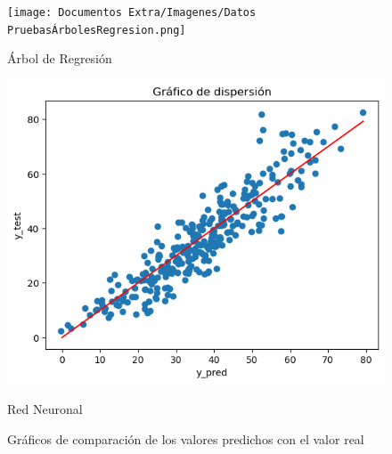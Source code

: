 \begin{figure}[h]
\begin{minipage}{0.32\textwidth}
    \texttt{[image: Documentos Extra/Imagenes/Datos PruebasÁrbolesRegresion.png]}
    \caption{Árbol de Regresión}
    \label{fig:regression_tree}
  \end{minipage}
  \begin{minipage}{0.32\textwidth}
    \includegraphics[width=\textwidth]{Documentos Extra/Imagenes/Datos PruebasRedNeuronal.png}
    \caption{Red Neuronal}
    \label{fig:red_neuronal}
  \end{minipage}
  \caption{Gráficos de comparación de los valores predichos con el valor real}
  \label{fig: comparación}
 \end{figure}








